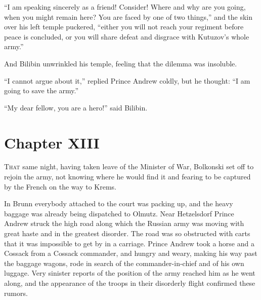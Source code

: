 ``I am speaking sincerely as a friend! Consider! Where and why
are you going, when you might remain here? You are faced by one
of two things,'' and the skin over his left temple puckered,
``either you will not reach your regiment before peace is
concluded, or you will share defeat and disgrace with Kutuzov's
whole army.''

And Bilibin unwrinkled his temple, feeling that the dilemma was
insoluble.

``I cannot argue about it,'' replied Prince Andrew coldly, but he
thought: ``I am going to save the army.''

``My dear fellow, you are a hero!'' said Bilibin.


\chapter*{Chapter XIII}
\ifaudio     {} \fi


\lettrine[lines=2, loversize=0.3, lraise=0]{\initfamily T}{hat}
same night, having taken leave of the Minister of War,
Bolkonski set off to rejoin the army, not knowing where he would
find it and fearing to be captured by the French on the way to
Krems.

In Brunn everybody attached to the court was packing up, and the
heavy baggage was already being dispatched to Olmutz. Near
Hetzelsdorf Prince Andrew struck the high road along which the
Russian army was moving with great haste and in the greatest
disorder. The road was so obstructed with carts that it was
impossible to get by in a carriage. Prince Andrew took a horse
and a Cossack from a Cossack commander, and hungry and weary,
making his way past the baggage wagons, rode in search of the
commander-in-chief and of his own luggage. Very sinister reports
of the position of the army reached him as he went along, and the
appearance of the troops in their disorderly flight confirmed
these rumors.

